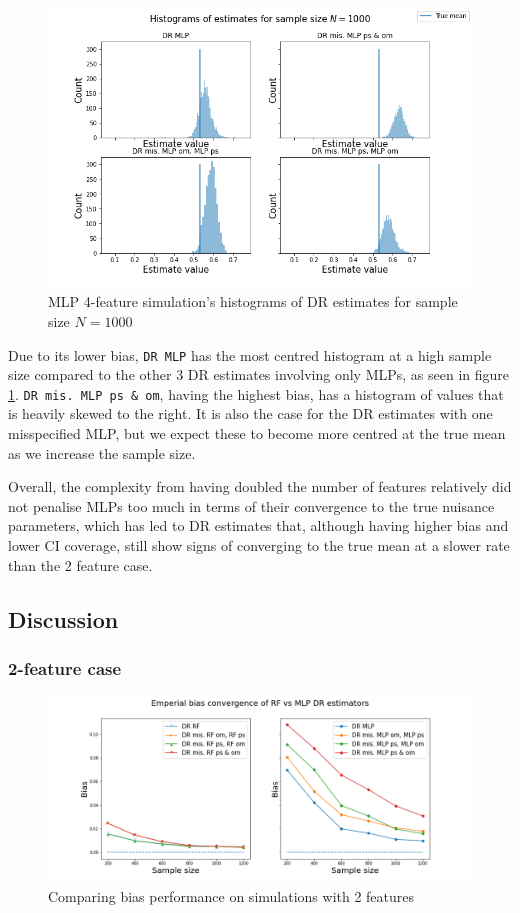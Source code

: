 \documentclass[12pt,twoside]{article}
\begin{document}
\begin{figure}[h!]
    \centering
    \includegraphics[width = 0.9\columnwidth]{figures/histMLP_moreW.png}
    \caption{MLP 4-feature simulation's histograms of DR estimates for sample size $N = 1000$}
    \label{fighistMLP_moreW}
\end{figure}

Due to its lower bias, \texttt{DR MLP} has the most centred histogram at a high sample size compared to the other 3 DR estimates involving only MLPs, as seen in figure \ref{fighistMLP_moreW}. \texttt{DR mis. MLP ps \& om}, having the highest bias, has a histogram of values that is heavily skewed to the right. It is also the case for the DR estimates with one misspecified MLP, but we expect these to become more centred at the true mean as we increase the sample size.

Overall, the complexity from having doubled the number of features relatively did not penalise MLPs too much in terms of their convergence to the true nuisance parameters, which has led to DR estimates that, although having higher bias and lower CI coverage, still show signs of converging to the true mean at a slower rate than the 2 feature case.
\clearpage
\subsection{Discussion}

\subsubsection{2-feature case} \label{2 features}

\begin{figure}[h!]
    \centering
    \includegraphics[width = 0.9\columnwidth]{figures/biascompare.png}
    \caption{Comparing bias performance on simulations with 2 features}
    \label{biascompare}
\end{figure}
\end{document}
